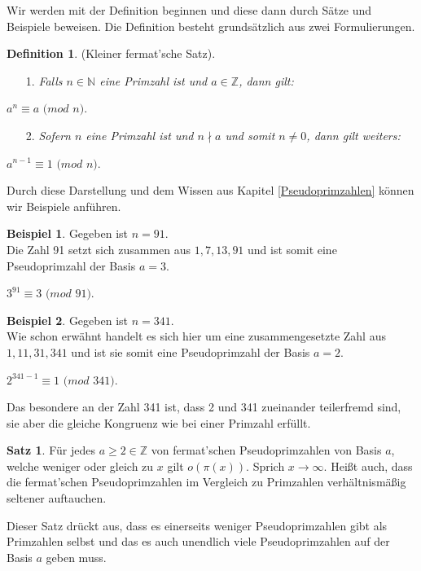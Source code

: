 \documentclass[12pt,a4paper]{article}
\theoremstyle{definition}
\newtheorem{defi}{Definition}[section]
\newtheorem{satz}{Satz}[subsection]
\newtheorem{bsp}{Beispiel}[subsection]
\begin{document}
Wir werden mit der Definition beginnen und diese dann durch Sätze und Beispiele beweisen.
Die Definition besteht grundsätzlich aus zwei Formulierungen.
\begin{defi}(Kleiner fermat'sche Satz). \label{Kleiner fermat'sche Satz}
\begin{enumerate}
    \item[1.]\textit{Falls $n \in \mathbb{N}$ eine Primzahl ist und $a \in \mathbb{Z}$, dann gilt:}\end{enumerate}
\begin{center}
$a^{n} \equiv a$ $(mod$ $n)$.
\end{center}
\begin{enumerate}
    \item[2.]\textit{Sofern $n$ eine Primzahl ist und $n \nmid a$ und somit $n \neq 0$, dann gilt weiters:}\end{enumerate}
\begin{center}
$a^{n-1} \equiv 1$ $(mod$ $n)$.
\end{center}\end{defi}

Durch diese Darstellung und dem Wissen aus Kapitel \ref{Pseudoprimzahlen} können wir Beispiele anführen.

\begin{bsp} Gegeben ist $n = 91$.\\
Die Zahl 91 setzt sich zusammen aus $1, 7, 13, 91$ und ist somit eine Pseudoprimzahl der Basis $a = 3$.
\begin{center}
$3^{91} \equiv 3$ $(mod$ $91)$.
\end{center}\end{bsp}
\begin{bsp} Gegeben ist $n = 341$.\\
Wie schon erwähnt handelt es sich hier um eine zusammengesetzte Zahl aus $1, 11, 31, 341$ und ist sie somit eine Pseudoprimzahl der Basis $a = 2$.
\begin{center}
$2^{341-1} \equiv 1$ $(mod$ $341)$.
\end{center}\end{bsp}
Das besondere an der Zahl 341 ist, dass 2 und 341 zueinander teilerfremd sind, sie aber die gleiche Kongruenz wie bei einer Primzahl erfüllt.

\begin{satz}
Für jedes $a \geq 2 \in \mathbb{Z}$ von fermat'schen Pseudoprimzahlen von Basis $a$, welche weniger oder gleich zu $x$ gilt $o(\pi(x))$.
Sprich $x \rightarrow \infty$.
Heißt auch, dass die fermat'schen Pseudoprimzahlen im Vergleich zu Primzahlen verhältnismäßig seltener auftauchen.
\end{satz}
Dieser Satz drückt aus, dass es einerseits weniger Pseudoprimzahlen gibt als Primzahlen selbst und das es auch unendlich viele Pseudoprimzahlen auf der Basis $a$ geben muss.
\end{document}
